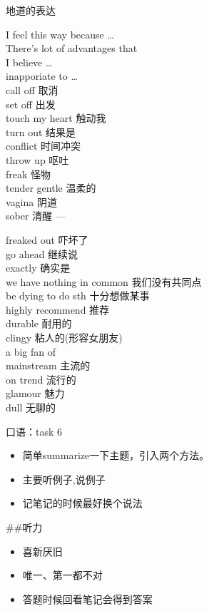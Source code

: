 \documentclass[ignorenonframetext,]{beamer}
\begin{document}
\begin{frame}{地道的表达}
\protect\hypertarget{ux5730ux9053ux7684ux8868ux8fbe}{}

I feel this way because \ldots{}\\
There's lot of advantages that\\
I believe \ldots{}\\
inapporiate to \ldots{}\\
call off 取消\\
set off 出发\\
touch my heart 触动我\\
turn out 结果是\\
conflict 时间冲突\\
throw up 呕吐\\
freak 怪物\\
tender gentle 温柔的\\
vagina 阴道\\
sober 清醒 ---

freaked out 吓坏了\\
go ahead 继续说\\
exactly 确实是\\
we have nothing in common 我们没有共同点\\
be dying to do sth 十分想做某事\\
highly recommend 推荐\\
durable 耐用的\\
clingy 粘人的(形容女朋友)\\
a big fan of\\
mainstream 主流的\\
on trend 流行的\\
glamour 魅力\\
dull 无聊的

\begin{block}{口语：task 6}

\begin{itemize}
\item
  简单summarize一下主题，引入两个方法。
\item
  主要听例子,说例子
\item
  记笔记的时候最好换个说法
\end{itemize}

\#\#听力

\begin{itemize}
\item
  喜新厌旧
\item
  唯一、第一都不对
\item
  答题时候回看笔记会得到答案
\end{itemize}

\end{block}

\end{frame}
\end{document}
